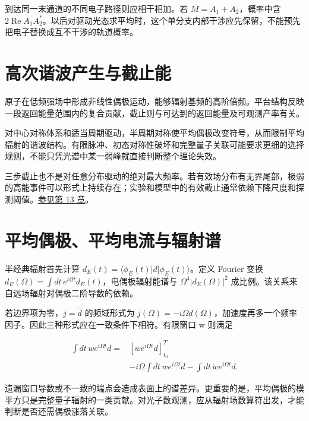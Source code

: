 \documentclass[UTF8,a4paper,zihao=-4,openany,fontset=fandol]{ctexbook}
\begin{document}
到达同一末通道的不同电子路径则应相干相加。若 $M=A_1+A_2$，概率中含 $2\operatorname{Re}A_1A_2^*$。以后对驱动光态求平均时，这个单分支内部干涉应先保留，不能预先把电子替换成互不干涉的轨道概率。



\section{高次谐波产生与截止能}\label{sec:04:7}


原子在低频强场中形成非线性偶极运动，能够辐射基频的高阶倍频。平台结构反映一段返回能量范围内的复合贡献，截止则与可达到的返回能量及可观测产率有关。



对中心对称体系和适当周期驱动，半周期对称使平均偶极改变符号，从而限制平均辐射的谐波结构。有限脉冲、初态对称性破坏和完整量子关联可能要求更细的选择规则，不能只凭光谱中某一弱峰就直接判断整个理论失效。



三步截止也不是对任意分布驱动的绝对最大频率。若有效场分布有无界尾部，极弱的高能事件可以形式上持续存在；实验和模型中的有效截止通常依赖下降尺度和探测阈值。\hyperref[ch:13]{参见第 13 章}。



\section{平均偶极、平均电流与辐射谱}\label{sec:04:8}


半经典辐射首先计算 $d_E(t)=\langle\phi_E(t)|d|\phi_E(t)\rangle$。定义 Fourier 变换 $d_E(\Omega)=\int dt\,e^{i\Omega t}d_E(t)$，电偶极辐射能谱与 $\Omega^4|d_E(\Omega)|^2$ 成比例。该关系来自远场辐射对偶极二阶导数的依赖。



若边界项为零，$j=\dot d$ 的频域形式为 $j(\Omega)=-i\Omega d(\Omega)$，加速度再多一个频率因子。因此三种形式应在一致条件下相符。有限窗口 w 则满足



\begin{equation*}
\begin{aligned}
\int dt\,we^{i\Omega t}\dot d
={}&[we^{i\Omega t}d]_{t_0}^{T}\\
&-i\Omega\int dt\,we^{i\Omega t}d
-\int dt\,\dot w e^{i\Omega t}d.
\end{aligned}
\tag{4.6}\label{eq:4.6}
\end{equation*}


遗漏窗口导数或不一致的端点会造成表面上的谱差异。更重要的是，平均偶极的模平方只是完整量子辐射的一类贡献。对光子数观测，应从辐射场数算符出发，才能判断是否还需偶极涨落关联。
\end{document}
